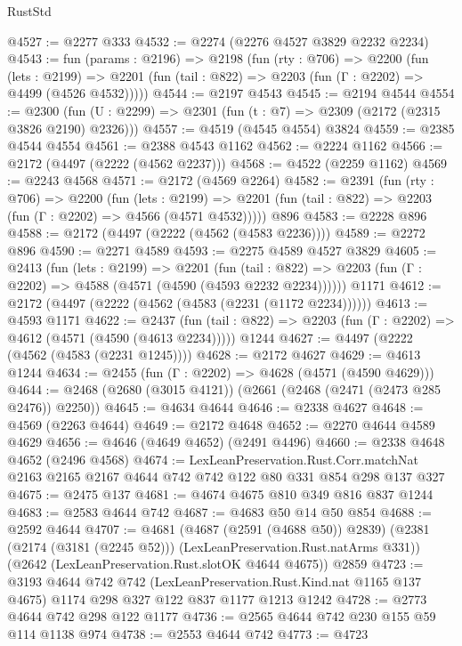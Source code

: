 \begin{lexlean}{RustStd}
\begin{coremodule}
@4527 := @2277 @333
@4532 := @2274 (@2276 @4527 @3829 @2232 @2234)
@4543 := fun (params : @2196) =>
  @2198
    (fun (rty : @706) =>
    @2200
      (fun (lets : @2199) =>
      @2201 (fun (tail : @822) => @2203 (fun (Γ : @2202) => @4499 (@4526 @4532)))))
@4544 := @2197 @4543
@4545 := @2194 @4544
@4554 := @2300 (fun (U : @2299) => @2301 (fun (t : @7) => @2309 (@2172 (@2315 @3826 @2190) @2326)))
@4557 := @4519 (@4545 @4554) @3824
@4559 := @2385 @4544 @4554
@4561 := @2388 @4543 @1162
@4562 := @2224 @1162
@4566 := @2172 (@4497 (@2222 (@4562 @2237)))
@4568 := @4522 (@2259 @1162)
@4569 := @2243 @4568
@4571 := @2172 (@4569 @2264)
@4582 := @2391
    (fun (rty : @706) =>
    @2200
      (fun (lets : @2199) =>
      @2201 (fun (tail : @822) => @2203 (fun (Γ : @2202) => @4566 (@4571 @4532)))))
    @896
@4583 := @2228 @896
@4588 := @2172 (@4497 (@2222 (@4562 (@4583 @2236))))
@4589 := @2272 @896
@4590 := @2271 @4589
@4593 := @2275 @4589 @4527 @3829
@4605 := @2413
    (fun (lets : @2199) =>
    @2201
      (fun (tail : @822) => @2203 (fun (Γ : @2202) => @4588 (@4571 (@4590 (@4593 @2232 @2234))))))
    @1171
@4612 := @2172 (@4497 (@2222 (@4562 (@4583 (@2231 (@1172 @2234))))))
@4613 := @4593 @1171
@4622 := @2437
    (fun (tail : @822) => @2203 (fun (Γ : @2202) => @4612 (@4571 (@4590 (@4613 @2234)))))
    @1244
@4627 := @4497 (@2222 (@4562 (@4583 (@2231 @1245))))
@4628 := @2172 @4627
@4629 := @4613 @1244
@4634 := @2455 (fun (Γ : @2202) => @4628 (@4571 (@4590 @4629)))
@4644 := @2468 (@2680 (@3015 @4121)) (@2661 (@2468 (@2471 (@2473 @285 @2476)) @2250))
@4645 := @4634 @4644
@4646 := @2338 @4627
@4648 := @4569 (@2263 @4644)
@4649 := @2172 @4648
@4652 := @2270 @4644 @4589 @4629
@4656 := @4646 (@4649 @4652) (@2491 @4496)
@4660 := @2338 @4648 @4652 (@2496 @4568)
@4674 := LexLeanPreservation.Rust.Corr.matchNat
    @2163
    @2165
    @2167
    @4644
    @742
    @742
    @122
    @80
    @331
    @854
    @298
    @137
    @327
@4675 := @2475 @137
@4681 := @4674 @4675 @810 @349 @816 @837 @1244
@4683 := @2583 @4644 @742
@4687 := @4683 @50 @14 @50 @854
@4688 := @2592 @4644
@4707 := @4681
    (@4687 (@2591 (@4688 @50)) @2839)
    (@2381 (@2174 (@3181 (@2245 @52))) (LexLeanPreservation.Rust.natArms @331))
    (@2642 (LexLeanPreservation.Rust.slotOK @4644 @4675))
    @2859
@4723 := @3193
    @4644
    @742
    @742
    (LexLeanPreservation.Rust.Kind.nat @1165 @137 @4675)
    @1174
    @298
    @327
    @122
    @837
    @1177
    @1213
    @1242
@4728 := @2773 @4644 @742 @298 @122 @1177
@4736 := @2565 @4644 @742 @230 @155 @59 @114 @1138 @974
@4738 := @2553 @4644 @742
@4773 := @4723

\end{coremodule}
\end{lexlean}
